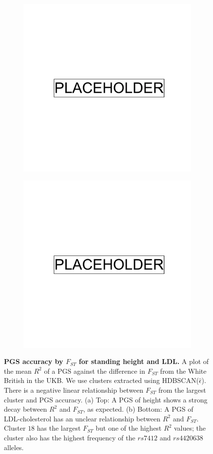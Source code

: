 \begin{figure}[ht]
  \centering
  \begin{subfigure}[b]{0.6\linewidth}
\includegraphics[width=0.6\linewidth]{placeholder.png}
    \caption{}
    \label{fig:fst_vs_r2_height}
  \end{subfigure}
    \begin{subfigure}[b]{0.6\linewidth}
\includegraphics[width=0.6\linewidth]{placeholder.png}
    \caption{}
    \label{fig:fst_vs_r2_ldl}
  \end{subfigure}
  \caption[PGS accuracy by $F_{ST}$]{\textbf{PGS accuracy by $F_{ST}$ for standing height and LDL.}  A plot of the mean $R^2$ of a PGS against the difference in $F_{ST}$ from the White British in the UKB. We use clusters extracted using HDBSCAN($\hat{\epsilon}$). There is a negative linear relationship between $F_{ST}$ from the largest cluster and PGS accuracy. (a) Top: A PGS of height shows a strong decay between $R^2$ and $F_{ST}$, as expected. (b) Bottom: A PGS of LDL-cholesterol has an unclear relationship between $R^2$ and $F_{ST}$. Cluster $18$ has the largest $F_{ST}$ but one of the highest $R^2$ values; the cluster also has the highest frequency of the $rs7412$ and $rs4420638$ alleles.} 
  \label{fig:fst_vs_r2}
\end{figure}

